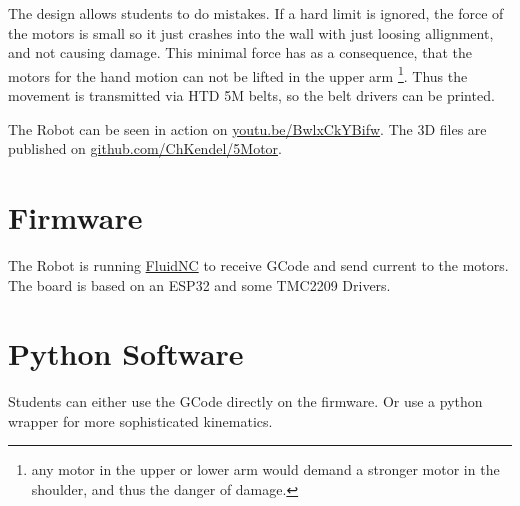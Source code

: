 \documentclass[12pt,twoside,a4paper]{article}
\begin{document}
The design  allows students to do mistakes. If a hard limit is ignored, the force of the motors is small so it just  crashes into the wall  with just loosing allignment, and not causing damage.  This minimal  force has as a consequence, that the motors for the hand motion can not be lifted in the upper arm%
%
\footnote{any motor in the upper or lower arm would demand a stronger  motor in the shoulder, and thus the danger of damage.}.
% 
 Thus the movement is transmitted via 
HTD 5M belts, so the belt drivers can be printed.

The Robot can be seen in action on   \href{https://youtu.be/BwlxCkYBifw}{youtu.be/BwlxCkYBifw}. The 3D files are published on  \href{https://github.com/ChKendel/5Motor}{github.com/ChKendel/5Motor}.



 \section{Firmware}

The  Robot is running \href{https://github.com/bdring/FluidNC}{FluidNC} to receive GCode and send current to the motors. The board is based on an  ESP32 
and some TMC2209 Drivers. 

\section{Python Software} 

Students can either use the GCode directly on the firmware. Or use a python wrapper for more sophisticated kinematics.
\end{document}
